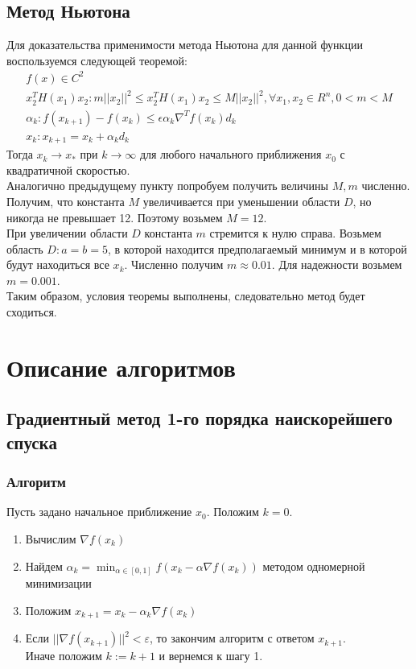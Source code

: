 \subsection{Метод Ньютона}
Для доказательства применимости метода Ньютона для данной функции воспользуемся следующей теоремой:
\begin{gather}
f(x)\in C^2 \\
x_2^TH(x_1)x_2: m||x_2||^2\leq x_2^TH(x_1)x_2 \leq M||x_2||^2, \forall x_1, x_2 \in R^n, 0<m<M \\
\alpha_k: f(x_{k+1})-f(x_k)\leq \epsilon\alpha_k \nabla^Tf(x_k)d_k \\
x_k: x_{k+1}=x_k+\alpha_k d_k
\end{gather}
Тогда $x_k\rightarrow x_\ast$ при $k \rightarrow \infty$ для любого начального приближения $x_0$ с квадратичной скоростью.\\
Аналогично предыдущему пункту попробуем получить величины $M, m$ численно.\\ Получим, что константа $M$ увеличивается при уменьшении области $D$, но никогда не превышает 12. Поэтому возьмем $M=12$. \\
При увеличении области $D$ константа $m$ стремится к нулю справа. Возьмем область $D: a=b=5$, в которой находится предполагаемый минимум и в которой будут находиться все $x_k$. Численно получим $m\approx0.01$. Для надежности возьмем $m=0.001$.\\
Таким образом, условия теоремы выполнены, следовательно метод будет сходиться.


\section{Описание алгоритмов}
\subsection{Градиентный метод 1-го порядка наискорейшего спуска}
\subsubsection{Алгоритм}
Пусть задано начальное приближение $x_0$. Положим $k=0$.
\begin{enumerate}
  \item Вычислим $\nabla f(x_k)$
  \item Найдем $\alpha_k=\min_{\alpha \in [0,1]} f(x_k-\alpha \nabla f(x_k))$ методом одномерной минимизации
  \item Положим $x_{k+1}=x_k-\alpha_k \nabla f(x_k)$
  \item Если $||\nabla f(x_{k+1})||^2 < \varepsilon$, то закончим алгоритм с ответом $x_{k+1}$.\\
  Иначе положим $k:=k+1$ и вернемся к шагу 1. 
\end{enumerate}

